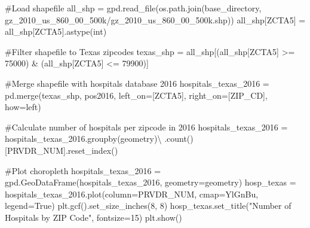 \documentclass[
  letterpaper,
  DIV=11,
  numbers=noendperiod]{scrartcl}
\newenvironment{Shaded}{\begin{snugshade}}{\end{snugshade}}
\newcommand{\BuiltInTok}[1]{\textcolor[rgb]{0.00,0.23,0.31}{#1}}
\newcommand{\CommentTok}[1]{\textcolor[rgb]{0.37,0.37,0.37}{#1}}
\newcommand{\DecValTok}[1]{\textcolor[rgb]{0.68,0.00,0.00}{#1}}
\newcommand{\NormalTok}[1]{\textcolor[rgb]{0.00,0.23,0.31}{#1}}
\newcommand{\OperatorTok}[1]{\textcolor[rgb]{0.37,0.37,0.37}{#1}}
\newcommand{\StringTok}[1]{\textcolor[rgb]{0.13,0.47,0.30}{#1}}
\newcommand{\VariableTok}[1]{\textcolor[rgb]{0.07,0.07,0.07}{#1}}
\begin{document}
\begin{Shaded}
\begin{Highlighting}[]
\CommentTok{\#Load shapefile}
\NormalTok{all\_shp }\OperatorTok{=}\NormalTok{ gpd.read\_file(os.path.join(base\_directory, }\StringTok{\textquotesingle{}gz\_2010\_us\_860\_00\_500k/gz\_2010\_us\_860\_00\_500k.shp\textquotesingle{}}\NormalTok{))}
\NormalTok{all\_shp[}\StringTok{\textquotesingle{}ZCTA5\textquotesingle{}}\NormalTok{] }\OperatorTok{=}\NormalTok{ all\_shp[}\StringTok{\textquotesingle{}ZCTA5\textquotesingle{}}\NormalTok{].astype(}\BuiltInTok{int}\NormalTok{)}

\CommentTok{\#Filter shapefile to Texas zipcodes}
\NormalTok{texas\_shp }\OperatorTok{=}\NormalTok{ all\_shp[(all\_shp[}\StringTok{\textquotesingle{}ZCTA5\textquotesingle{}}\NormalTok{] }\OperatorTok{\textgreater{}=} \DecValTok{75000}\NormalTok{) }\OperatorTok{\&}\NormalTok{ (all\_shp[}\StringTok{\textquotesingle{}ZCTA5\textquotesingle{}}\NormalTok{] }\OperatorTok{\textless{}=} \DecValTok{79900}\NormalTok{)]}

\CommentTok{\#Merge shapefile with hospitals database 2016}
\NormalTok{hospitals\_texas\_2016 }\OperatorTok{=}\NormalTok{ pd.merge(texas\_shp, pos2016, left\_on}\OperatorTok{=}\NormalTok{[}\StringTok{\textquotesingle{}ZCTA5\textquotesingle{}}\NormalTok{], right\_on}\OperatorTok{=}\NormalTok{[}\StringTok{\textquotesingle{}ZIP\_CD\textquotesingle{}}\NormalTok{], how}\OperatorTok{=}\StringTok{\textquotesingle{}left\textquotesingle{}}\NormalTok{)}

\CommentTok{\#Calculate number of hospitals per zipcode in 2016}
\NormalTok{hospitals\_texas\_2016 }\OperatorTok{=}\NormalTok{ hospitals\_texas\_2016.groupby(}\StringTok{\textquotesingle{}geometry\textquotesingle{}}\NormalTok{)}\OperatorTok{\textbackslash{}}
\NormalTok{    .count()[}\StringTok{\textquotesingle{}PRVDR\_NUM\textquotesingle{}}\NormalTok{].reset\_index()}

\CommentTok{\#Plot choropleth }
\NormalTok{hospitals\_texas\_2016 }\OperatorTok{=}\NormalTok{ gpd.GeoDataFrame(hospitals\_texas\_2016, geometry}\OperatorTok{=}\StringTok{\textquotesingle{}geometry\textquotesingle{}}\NormalTok{)}
\NormalTok{hosp\_texas }\OperatorTok{=}\NormalTok{ hospitals\_texas\_2016.plot(column}\OperatorTok{=}\StringTok{\textquotesingle{}PRVDR\_NUM\textquotesingle{}}\NormalTok{, cmap}\OperatorTok{=}\StringTok{\textquotesingle{}YlGnBu\textquotesingle{}}\NormalTok{, legend}\OperatorTok{=}\VariableTok{True}\NormalTok{)}
\NormalTok{plt.gcf().set\_size\_inches(}\DecValTok{8}\NormalTok{, }\DecValTok{8}\NormalTok{)}
\NormalTok{hosp\_texas.set\_title(}\StringTok{"Number of Hospitals by ZIP Code"}\NormalTok{, fontsize}\OperatorTok{=}\DecValTok{15}\NormalTok{)}
\NormalTok{plt.show()}
\end{Highlighting}
\end{Shaded}
\end{document}
